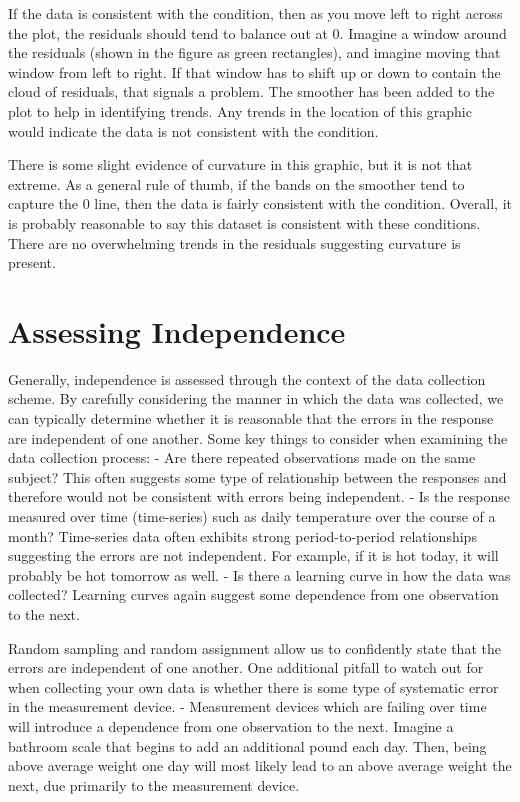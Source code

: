 \documentclass[]{book}
\theoremstyle{definition}
\theoremstyle{definition}
\theoremstyle{definition}
\theoremstyle{remark}
\begin{document}
If the data is consistent with the condition, then as you move left to
right across the plot, the residuals should tend to balance out at 0.
Imagine a window around the residuals (shown in the figure as green
rectangles), and imagine moving that window from left to right. If that
window has to shift up or down to contain the cloud of residuals, that
signals a problem. The smoother has been added to the plot to help in
identifying trends. Any trends in the location of this graphic would
indicate the data is not consistent with the condition.

There is some slight evidence of curvature in this graphic, but it is
not that extreme. As a general rule of thumb, if the bands on the
smoother tend to capture the 0 line, then the data is fairly consistent
with the condition. Overall, it is probably reasonable to say this
dataset is consistent with these conditions. There are no overwhelming
trends in the residuals suggesting curvature is present.

\section{Assessing Independence}\label{assessing-independence-1}

Generally, independence is assessed through the context of the data
collection scheme. By carefully considering the manner in which the data
was collected, we can typically determine whether it is reasonable that
the errors in the response are independent of one another. Some key
things to consider when examining the data collection process: - Are
there repeated observations made on the same subject? This often
suggests some type of relationship between the responses and therefore
would not be consistent with errors being independent. - Is the response
measured over time (time-series) such as daily temperature over the
course of a month? Time-series data often exhibits strong
period-to-period relationships suggesting the errors are not
independent. For example, if it is hot today, it will probably be hot
tomorrow as well. - Is there a learning curve in how the data was
collected? Learning curves again suggest some dependence from one
observation to the next.

Random sampling and random assignment allow us to confidently state that
the errors are independent of one another. One additional pitfall to
watch out for when collecting your own data is whether there is some
type of systematic error in the measurement device. - Measurement
devices which are failing over time will introduce a dependence from one
observation to the next. Imagine a bathroom scale that begins to add an
additional pound each day. Then, being above average weight one day will
most likely lead to an above average weight the next, due primarily to
the measurement device.
\end{document}
